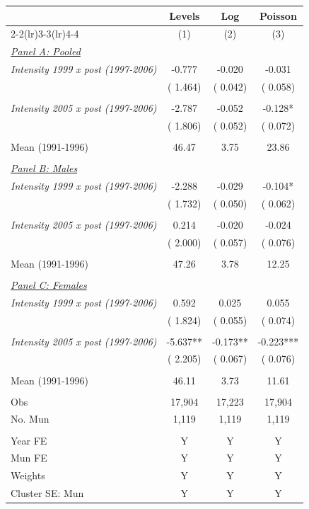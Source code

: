 \begin{tabular}{lccc} \hline \hline
& Levels & Log & Poisson \\ 
\cmidrule(lr){2-2}\cmidrule(lr){3-3}\cmidrule(lr){4-4}
& \multicolumn{1}{c}{(1)} & \multicolumn{1}{c}{(2)} & \multicolumn{1}{c}{(3)} \\ \toprule
\underline{\textit{Panel A: Pooled}}  \\ 
\textit{Intensity 1999 x post (1997-2006)} &       -0.777 &       -0.020 &       -0.031 \\ 
  & (       1.464) & (       0.042) & (       0.058) \\ 
   & & & \\ 
\textit{Intensity 2005 x post (1997-2006)} &       -2.787 &       -0.052 &       -0.128* \\ 
 & (       1.806) & (       0.052) & (       0.072) \\ 
  & & & \\ 
Mean (1991-1996)  &        46.47 &         3.75 &        23.86 \\ 
  & & &  \\ 
\underline{\textit{Panel B: Males}}  \\ 
\textit{Intensity 1999 x post (1997-2006)} &       -2.288 &       -0.029 &       -0.104* \\ 
  & (       1.732) & (       0.050) & (       0.062) \\ 
  & & & \\ 
\textit{Intensity 2005 x post (1997-2006)}  &        0.214 &       -0.020 &       -0.024 \\ 
 & (       2.000) & (       0.057) & (       0.076) \\ 
 & & & \\ 
Mean (1991-1996) &        47.26 &         3.78 &        12.25 \\ 
  & & &  \\ 
\underline{\textit{Panel C: Females}}  \\ 
\textit{Intensity 1999 x post (1997-2006)}  &        0.592 &        0.025 &        0.055 \\ 
  & (       1.824) & (       0.055) & (       0.074) \\ 
  & & & \\ 
\textit{Intensity 2005 x post (1997-2006)} &       -5.637** &       -0.173** &       -0.223*** \\ 
 & (       2.205) & (       0.067) & (       0.076) \\ 
   & & & \\ 
Mean (1991-1996)  &        46.11 &         3.73 &        11.61 \\ 
  & & &  \\ 
Obs &       17,904 &       17,223 &       17,904 \\ 
No. Mun &        1,119 &        1,119 &        1,119 \\ 
  & & & \\ 
Year FE & Y & Y & Y \\ 
Mun FE  & Y & Y & Y \\ 
Weights & Y & Y & Y \\ 
Cluster SE: Mun & Y & Y & Y \\ 
\bottomrule
\end{tabular}